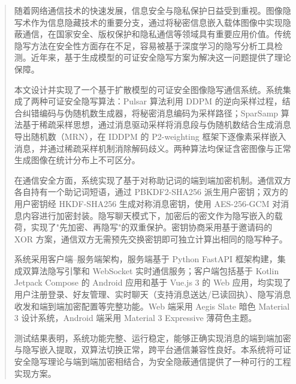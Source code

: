 \newcommand{\keywordsCn}[1][图像隐写；可证安全；扩散模型；端到端加密；跨平台通信；隐写系统]{#1}
\begin{abstract}
    随着网络通信技术的快速发展，信息安全与隐私保护日益受到重视。图像隐写术作为信息隐藏技术的重要分支，通过将秘密信息嵌入载体图像中实现隐蔽通信，在国家安全、版权保护和隐私通信等领域具有重要应用价值。传统隐写方法在安全性方面存在不足，容易被基于深度学习的隐写分析工具检测。近年来，基于生成模型的可证安全隐写方案为解决这一问题提供了理论保障。

    本文设计并实现了一个基于扩散模型的可证安全图像隐写通信系统。系统集成了两种可证安全隐写算法：Pulsar 算法利用 DDPM 的逆向采样过程，结合纠错编码与伪随机数生成器，将秘密消息编码为采样路径；SparSamp 算法基于稀疏采样思想，通过消息驱动采样将消息段与伪随机数结合生成消息导出随机数（MRN），在 IDDPM 的 P2-weighting 框架下逐像素采样嵌入消息，并通过稀疏采样机制消除解码歧义。两种算法均保证含密图像与正常生成图像在统计分布上不可区分。

    在通信安全方面，系统实现了基于对称助记词的端到端加密机制。通信双方各自持有一个助记词短语，通过 PBKDF2-SHA256 派生用户密钥；双方的用户密钥经 HKDF-SHA256 生成对称消息密钥，使用 AES-256-GCM 对消息内容进行加密封装。隐写聊天模式下，加密后的密文作为隐写嵌入的载荷，实现了"先加密、再隐写"的双重保护。密钥协商采用基于邀请码的 XOR 方案，通信双方无需预先交换密钥即可独立计算出相同的隐写种子。

    系统采用客户端--服务端架构，服务端基于 Python FastAPI 框架构建，集成双算法隐写引擎和 WebSocket 实时通信服务；客户端包括基于 Kotlin Jetpack Compose 的 Android 应用和基于 Vue.js 3 的 Web 应用，均实现了用户注册登录、好友管理、实时聊天（支持消息送达/已读回执）、隐写消息收发和端到端加密配置等完整功能。Web 端采用 Aegis Slate 暗色 Material 3 设计系统，Android 端采用 Material 3 Expressive 薄荷色主题。

    测试结果表明，系统功能完整、运行稳定，能够正确实现消息的端到端加密与隐写嵌入提取，双算法切换正常，跨平台通信兼容性良好。本系统将可证安全隐写理论与端到端加密相结合，为安全隐蔽通信提供了一种可行的工程实现方案。
\end{abstract}


